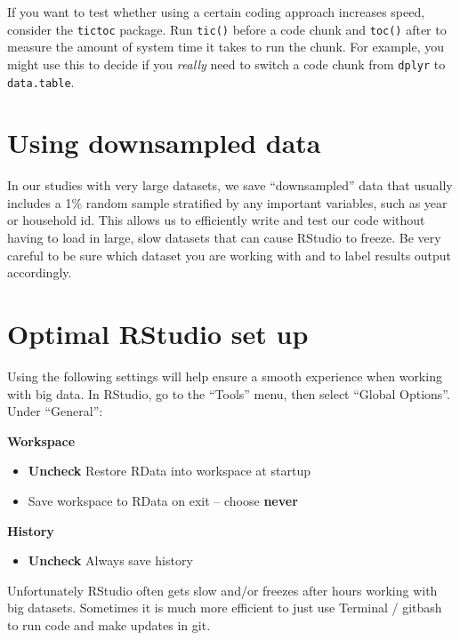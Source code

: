 \documentclass[
]{book}
\providecommand{\tightlist}{%
  \setlength{\itemsep}{0pt}\setlength{\parskip}{0pt}}
\begin{document}
If you want to test whether using a certain coding approach increases speed, consider the \texttt{tictoc} package. Run \texttt{tic()} before a code chunk and \texttt{toc()} after to measure the amount of system time it takes to run the chunk. For example, you might use this to decide if you \emph{really} need to switch a code chunk from \texttt{dplyr} to \texttt{data.table}.

\section{Using downsampled data}\label{using-downsampled-data}

In our studies with very large datasets, we save ``downsampled'' data that usually includes a 1\% random sample stratified by any important variables, such as year or household id. This allows us to efficiently write and test our code without having to load in large, slow datasets that can cause RStudio to freeze. Be very careful to be sure which dataset you are working with and to label results output accordingly.

\section{Optimal RStudio set up}\label{optimal-rstudio-set-up}

Using the following settings will help ensure a smooth experience when working with big data. In RStudio, go to the ``Tools'' menu, then select ``Global Options''. Under ``General'':

\textbf{Workspace}

\begin{itemize}
\tightlist
\item
  \textbf{Uncheck} Restore RData into workspace at startup
\item
  Save workspace to RData on exit -- choose \textbf{never}
\end{itemize}

\textbf{History}

\begin{itemize}
\tightlist
\item
  \textbf{Uncheck} Always save history
\end{itemize}

Unfortunately RStudio often gets slow and/or freezes after hours working with big datasets. Sometimes it is much more efficient to just use Terminal / gitbash to run code and make updates in git.
\end{document}
